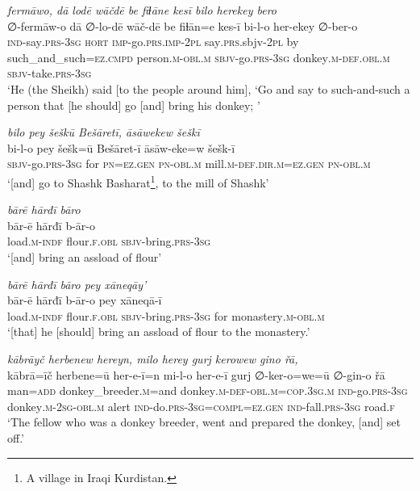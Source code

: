 \ea \label{HB.11}
\textit{fermāwo, dā lodē wāčdē be fiɫāne kesī bilo herekey bero} \\ 
\gll ∅-fermāw-o dā ∅-lo-dē wāč-dē be fiɫān=e kes-ī bi-l-o her-ekey ∅-ber-o \\ 
 \textsc{ind-}say\textsc{.prs}\textsc{-3sg} \textsc{hort} \textsc{imp-}go\textsc{.prs}\textsc{.imp}\textsc{-2pl} say\textsc{.prs}.sbjv\textsc{-2pl} by such\_and\_such\textsc{=ez}\textsc{.cmpd} person\textsc{.m}\textsc{-obl}\textsc{.m} \textsc{sbjv-}go\textsc{.prs}\textsc{-3sg} donkey\textsc{.m}\textsc{-def}\textsc{.obl}\textsc{.m} \textsc{sbjv-}take\textsc{.prs}\textsc{-3sg} \\ 
\glt `He (the Sheikh) said [to the people around him], ‘Go and say to such-and-such a person that [he should] go [and] bring his donkey; '
\z 
 
\ea \label{HB.12}
\textit{bilo pey šeškū Bešāretī, āsāwekew šeškī} \\ 
\gll bi-l-o pey šešk=ū Bešāret-ī āsāw-eke=w šešk-ī \\ 
 \textsc{sbjv-}go\textsc{.prs}\textsc{-3sg} for \textsc{pn}\textsc{=ez}\textsc{.gen} \textsc{pn}\textsc{-obl}\textsc{.m} mill\textsc{.m}\textsc{-def}\textsc{.dir}\textsc{.m}\textsc{=ez}\textsc{.gen} \textsc{pn}\textsc{-obl}\textsc{.m} \\ 
\glt `[and] go to Shashk Basharat\footnote{A village in Iraqi Kurdistan.}, to the mill of Shashk'
\z 
 
\ea \label{HB.13}
\textit{bārē hārđī bāro} \\ 
\gll bār-ē hārđī b-ār-o \\ 
 load\textsc{.m}\textsc{-indf} flour\textsc{\textsc{.f}}\textsc{.obl} \textsc{sbjv-}bring\textsc{.prs}\textsc{-3sg} \\ 
\glt `[and] bring an assload of flour'
\z 
 
\ea \label{HB.14}
\textit{bārē hārđī bāro pey xāneqāy’} \\ 
\gll bār-ē hārđī b-ār-o pey xāneqā-ī \\ 
 load\textsc{.m}\textsc{-indf} flour\textsc{\textsc{.f}}\textsc{.obl} \textsc{sbjv-}bring\textsc{.prs}\textsc{-3sg} for monastery\textsc{.m}\textsc{-obl}\textsc{.m} \\ 
\glt `[that] he [should] bring an assload of flour to the monastery.'
\z 
 
\ea \label{HB.15}
\textit{kābrāyč herbenew hereyn, milo herey gurj kerowew gino řā,} \\ 
\gll kābrā=īč herbene=ū her-e-ī=n mi-l-o her-e-ī gurj ∅-ker-o=we=ū ∅-gin-o řā \\ 
 man\textsc{=add} donkey\_breeder\textsc{.m}=and donkey\textsc{.m}\textsc{-def}\textsc{-obl}\textsc{.m}\textsc{=cop}\textsc{.3sg}\textsc{.m} \textsc{ind-}go\textsc{.prs}\textsc{-3sg} donkey\textsc{.m}-\textsc{2sg}\textsc{-obl}\textsc{.m} alert \textsc{ind-}do\textsc{.prs}\textsc{-3sg}\textsc{=\textsc{compl}}\textsc{=ez}\textsc{.gen} \textsc{ind-}fall\textsc{.prs}\textsc{-3sg} road\textsc{\textsc{.f}} \\ 
\glt `The fellow who was a donkey breeder, went and prepared the donkey, [and] set off.'
\z 
 

